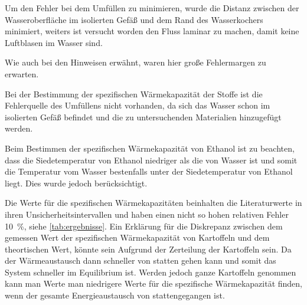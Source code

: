 \documentclass[11pt, ngerman]{scrartcl}
\begin{document}
Um den Fehler bei dem Umfüllen zu minimieren, wurde
die Distanz zwischen der Wasseroberfläche im isolierten
Gefäß und dem Rand des Wasserkochers minimiert, weiters
ist versucht worden den Fluss laminar zu machen, damit
keine Luftblasen im Wasser sind.

Wie auch bei den Hinweisen \cite{wärmehinweise} erwähnt, waren hier
große Fehlermargen zu erwarten.

Bei der Bestimmung der spezifischen Wärmekapazität der Stoffe
ist die Fehlerquelle des Umfüllens nicht vorhanden, da
sich das Wasser schon im isolierten Gefäß befindet und
die zu untersuchenden Materialien hinzugefügt werden.

Beim Bestimmen der spezifischen Wärmekapazität von Ethanol
ist zu beachten, dass die Siedetemperatur von Ethanol \cite{isopropanolsiede} 
niedriger als die von Wasser ist und somit die Temperatur vom Wasser
bestenfalls unter der Siedetemperatur von Ethanol liegt. Dies
wurde jedoch berücksichtigt.

Die Werte für die spezifischen Wärmekapazitäten beinhalten
die Literaturwerte in ihren Unsicherheitsintervallen und haben einen nicht
so hohen
relativen Fehler \SI{10}{\percent}, siehe \autoref{tab:ergebnisse}.
Ein Erklärung für die Diskrepanz zwischen dem gemessen Wert der
spezifischen Wärmekapazität von Kartoffeln und dem
theortischen Wert, könnte sein Aufgrund
der Zerteilung der Kartoffeln sein. Da der Wärmeaustausch
dann schneller von statten gehen kann und somit das System
schneller im Equilibrium ist. Werden jedoch
ganze Kartoffeln genommen kann man Werte man niedrigere
Werte für die spezifische Wärmekapazität finden, wenn
der gesamte Energieaustausch von stattengegangen ist.
\end{document}
